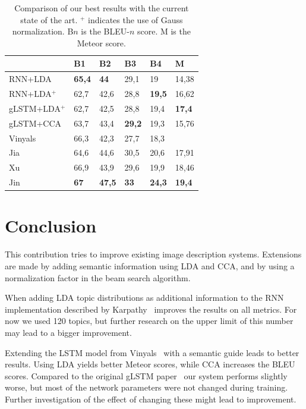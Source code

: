\documentclass[twoside,twocolumn]{article}
\begin{document}
\begin{table}
    \centering
    \begin{tabular}{llllll}
    ~                  & B1 & B2 & B3 & B4 & M \\ \hline
    RNN+LDA            & \textbf{65,4}   & \textbf{44}     & 29,1   & 19     & 14,38  \\
    RNN+LDA$^+$      & 62,7   & 42,6   & 28,8   & \textbf{19,5}   & 16,62  \\
    gLSTM+LDA$^+$    & 62,7   & 42,5   & 28,8   & 19,4   & \textbf{17,4}   \\
    gLSTM+CCA          & 63,7   & 43,4   & \textbf{29,2}   & 19,3   & 15,76  \\ \hline
    Vinyals~\cite{Google}           & 66,3   & 42,3   & 27,7   & 18,3   & ~      \\
    Jia~\cite{Fernando2015}  & 64,6   & 44,6   & 30,5   & 20,6   & 17,91  \\
    Xu~\cite{Xu2015}     & 66,9   & 43,9   & 29,6   & 19,9   & 18,46  \\
    Jin~\cite{Jin2015}      & \textbf{67}    & \textbf{47,5}   & \textbf{33}     & \textbf{24,3}   & \textbf{19,4}   \\ \hline
    \end{tabular}
    \caption{Comparison of our best results with the current state of the art. $^+$ indicates the use of Gauss normalization. B$n$ is the BLEU-$n$ score. M is the Meteor score.}
    \label{tab:sota}
\end{table}

\section{Conclusion}
This contribution tries to improve existing image description systems. Extensions are made by adding semantic information using LDA and CCA, and by using a normalization factor in the beam search algorithm.

When adding LDA topic distributions as additional information to the RNN implementation described by Karpathy~\cite{Karpathy2015} improves the results on all metrics. For now we used 120 topics, but further research on the upper limit of this number may lead to a bigger improvement.

Extending the LSTM model from Vinyals~\cite{Google} with a semantic guide leads to better results. Using LDA yields better Meteor scores, while CCA increases the BLEU scores. Compared to the original gLSTM paper~\cite{Fernando2015} our system performs slightly worse, but most of the network parameters were not changed during training. Further investigation of the effect of changing these might lead to improvement.
\end{document}

